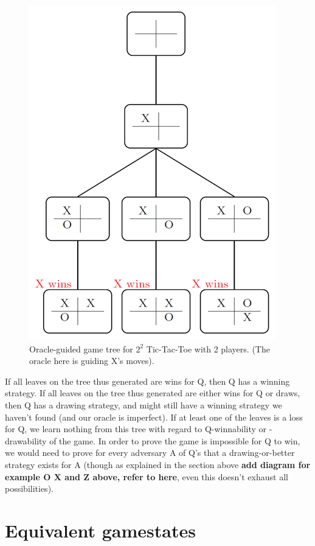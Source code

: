 \documentclass[english, 11pt]{article}
\begin{document}
\begin{figure}[!h]
	\centering
	\includegraphics[scale=.65]{./img/isotree.png}
	\caption{Oracle-guided game tree for $2^2$ Tic-Tac-Toe with 2 players. (The oracle here is guiding X's moves).} \label{fig:isotree}
\end{figure}
If all leaves on the tree thus generated are wins for Q, then Q has a winning strategy. If all leaves on the tree thus generated are either wins for Q or draws, then Q has a drawing strategy, and might still have a winning strategy we haven't found (and our oracle is imperfect). If at least one of the leaves is a loss for Q, we learn nothing from this tree with regard to Q-winnability or -drawability of the game. 
In order to prove the game is impossible for Q to win, we would need to prove for every adversary A of Q's that a drawing-or-better strategy exists for A (though as explained in the section above \textbf{add diagram for example O X and Z above, refer to here}, even this doesn't exhaust all possibilities). 

\section*{Equivalent gamestates}
\end{document}

